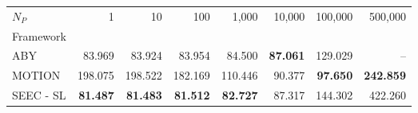 \begin{tabular}{lrrrrrrr}
\toprule
$N_P$ & 1 & 10 & 100 & 1,000 & 10,000 & 100,000 & 500,000 \\
Framework &  &  &  &  &  &  &  \\
\midrule
ABY~\cite{DSZ15} & 83.969 & 83.924 & 83.954 & 84.500 & \bfseries 87.061 & 129.029 & -- \\
MOTION~\cite{BDST22} & 198.075 & 198.522 & 182.169 & 110.446 & 90.377 & \bfseries 97.650 & \bfseries 242.859 \\
SEEC - SL & \bfseries 81.487 & \bfseries 81.483 & \bfseries 81.512 & \bfseries 82.727 & 87.317 & 144.302 & 422.260 \\
\bottomrule
\end{tabular}
